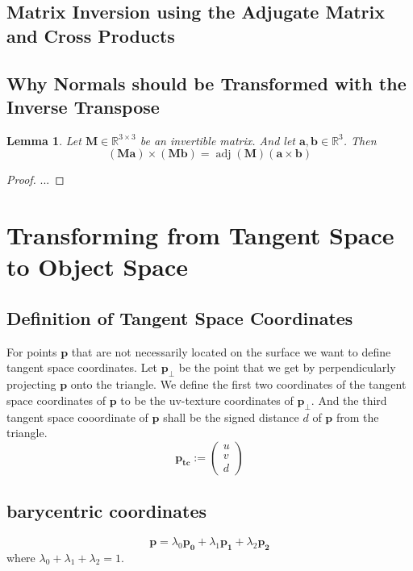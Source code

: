 \documentclass{article}
\newtheorem{lemma}{Lemma}
\newcommand{\R}{\mathbb{R}}
\newcommand{\vctr}[1]{\mathbf{#1}}
\newcommand{\point}[1]{\mathbf{#1}}
\newcommand{\mat}[1]{\mathbf{#1}}
\newcommand{\colvec}[1]{\begin{pmatrix}#1\end{pmatrix}}
\DeclareMathOperator{\adj}{adj}
\begin{document}
\subsection{Matrix Inversion using the Adjugate Matrix and Cross Products}

\subsection{Why Normals should be Transformed with the Inverse Transpose}

\begin{lemma}
Let \(\mat{M} \in \R^{3\times 3}\) be an invertible matrix. And let \(\vctr{a}, \vctr{b} \in \R^3\). Then
\[
(\mat{M}\vctr{a})\times(\mat{M}\vctr{b}) = \adj(\mat{M}) (\vctr{a} \times \vctr{b})
\]
\end{lemma}
\begin{proof}
 ...
\end{proof}


\section{Transforming from Tangent Space to Object Space}

\subsection{Definition of Tangent Space Coordinates}
For points \(\point{p}\) that are not necessarily located on the surface we want to define tangent space coordinates. Let \(\point{p_\perp}\) be the point that we get by perpendicularly projecting \(\point{p}\) onto the triangle. We define the first two coordinates of the tangent space coordinates of \(\point{p}\) to be the uv-texture coordinates of \(\point{p_\perp}\). And the third tangent space cooordinate of \(\point{p}\) shall be the signed distance \(d\) of \(\point{p}\) from the triangle.
\begin{equation*}
 \point{p_{tc}} := \colvec{u \\ v \\ d}
\end{equation*}

\subsection{barycentric coordinates}

\[
\point{p} = \lambda_0 \point{p_0} + \lambda_1 \point{p_1} + \lambda_2 \point{p_2}
\]
where \(\lambda_0 + \lambda_1 + \lambda_2 = 1\).
\end{document}
